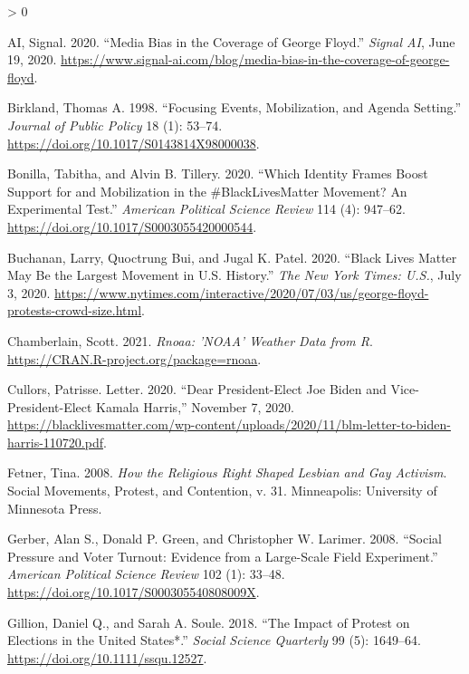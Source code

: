 \documentclass[
  12pt,
]{article}
\newlength{\cslhangindent}
\newenvironment{CSLReferences}[2] %
 {%
  \setlength{\parindent}{0pt}
  \ifodd #1 \everypar{\setlength{\hangindent}{\cslhangindent}}\ignorespaces\fi
  \ifnum #2 > 0
  \setlength{\parskip}{#2\baselineskip}
  \fi
 }%
 {}
\begin{document}
\hypertarget{refs}{}
\begin{CSLReferences}{1}{0}
\leavevmode\hypertarget{ref-SignalAI2020}{}%
AI, Signal. 2020. {``Media Bias in the Coverage of {George Floyd}.''} \emph{Signal AI}, June 19, 2020. \url{https://www.signal-ai.com/blog/media-bias-in-the-coverage-of-george-floyd}.

\leavevmode\hypertarget{ref-Birkland1998}{}%
Birkland, Thomas A. 1998. {``Focusing {Events}, {Mobilization}, and {Agenda Setting}.''} \emph{Journal of Public Policy} 18 (1): 53--74. \url{https://doi.org/10.1017/S0143814X98000038}.

\leavevmode\hypertarget{ref-Bonilla2020}{}%
Bonilla, Tabitha, and Alvin B. Tillery. 2020. {``Which {Identity Frames Boost Support} for and {Mobilization} in the \#{BlackLivesMatter Movement}? {An Experimental Test}.''} \emph{American Political Science Review} 114 (4): 947--62. \url{https://doi.org/10.1017/S0003055420000544}.

\leavevmode\hypertarget{ref-Buchanan2020}{}%
Buchanan, Larry, Quoctrung Bui, and Jugal K. Patel. 2020. {``Black {Lives Matter May Be} the {Largest Movement} in {U}.{S}. {History}.''} \emph{The New York Times: U.S.}, July 3, 2020. \url{https://www.nytimes.com/interactive/2020/07/03/us/george-floyd-protests-crowd-size.html}.

\leavevmode\hypertarget{ref-Chamberlain2021}{}%
Chamberlain, Scott. 2021. \emph{Rnoaa: '{NOAA}' {Weather Data} from {R}}. \url{https://CRAN.R-project.org/package=rnoaa}.

\leavevmode\hypertarget{ref-Cullors2020}{}%
Cullors, Patrisse. Letter. 2020. {``Dear {President}-{Elect Joe Biden} and {Vice}-{President}-{Elect Kamala Harris},''} November 7, 2020. \url{https://blacklivesmatter.com/wp-content/uploads/2020/11/blm-letter-to-biden-harris-110720.pdf}.

\leavevmode\hypertarget{ref-Fetner2008}{}%
Fetner, Tina. 2008. \emph{How the Religious Right Shaped Lesbian and Gay Activism}. Social Movements, Protest, and Contention, v. 31. {Minneapolis}: {University of Minnesota Press}.

\leavevmode\hypertarget{ref-Gerber2008}{}%
Gerber, Alan S., Donald P. Green, and Christopher W. Larimer. 2008. {``Social {Pressure} and {Voter Turnout}: {Evidence} from a {Large}-{Scale Field Experiment}.''} \emph{American Political Science Review} 102 (1): 33--48. \url{https://doi.org/10.1017/S000305540808009X}.

\leavevmode\hypertarget{ref-Gillion2018}{}%
Gillion, Daniel Q., and Sarah A. Soule. 2018. {``The {Impact} of {Protest} on {Elections} in the {United States}*.''} \emph{Social Science Quarterly} 99 (5): 1649--64. \url{https://doi.org/10.1111/ssqu.12527}.


\end{CSLReferences}
\end{document}

